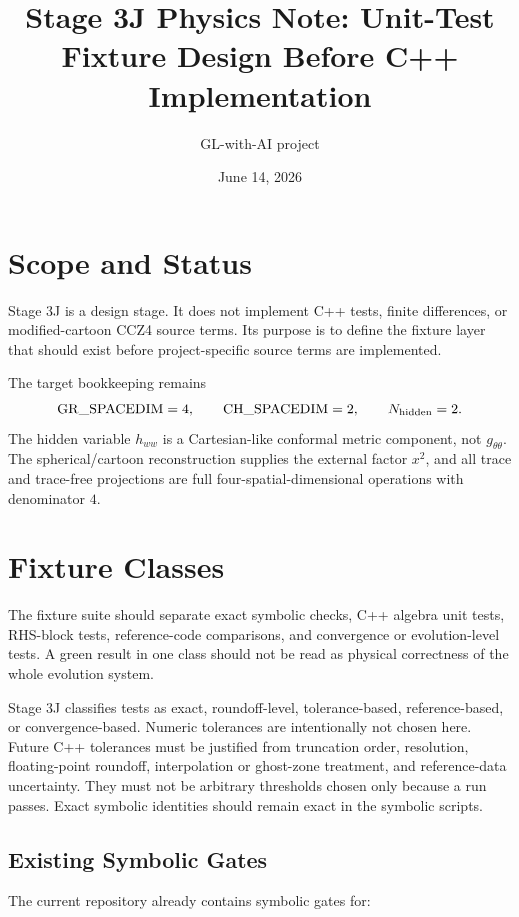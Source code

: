 \documentclass[11pt]{article}
\title{Stage 3J Physics Note: Unit-Test Fixture Design Before C++ Implementation}
\author{GL-with-AI project}
\date{June 14, 2026}
\begin{document}
\maketitle

\section{Scope and Status}

Stage 3J is a design stage. It does not implement C++ tests, finite
differences, or modified-cartoon CCZ4 source terms. Its purpose is to define
the fixture layer that should exist before project-specific source terms are
implemented.

The target bookkeeping remains
\[
  \mathrm{GR\_SPACEDIM}=4,\qquad
  \mathrm{CH\_SPACEDIM}=2,\qquad
  N_{\rm hidden}=2.
\]
The hidden variable \(h_{ww}\) is a Cartesian-like conformal metric component,
not \(g_{\theta\theta}\). The spherical/cartoon reconstruction supplies the
external factor \(x^2\), and all trace and trace-free projections are full
four-spatial-dimensional operations with denominator \(4\).

\section{Fixture Classes}

The fixture suite should separate exact symbolic checks, C++ algebra unit
tests, RHS-block tests, reference-code comparisons, and convergence or
evolution-level tests. A green result in one class should not be read as
physical correctness of the whole evolution system.

Stage 3J classifies tests as exact, roundoff-level, tolerance-based,
reference-based, or convergence-based. Numeric tolerances are intentionally not
chosen here. Future C++ tolerances must be justified from truncation order,
resolution, floating-point roundoff, interpolation or ghost-zone treatment, and
reference-data uncertainty. They must not be arbitrary thresholds chosen only
because a run passes. Exact symbolic identities should remain exact in the
symbolic scripts.

\subsection{Existing Symbolic Gates}

The current repository already contains symbolic gates for:
\end{document}
